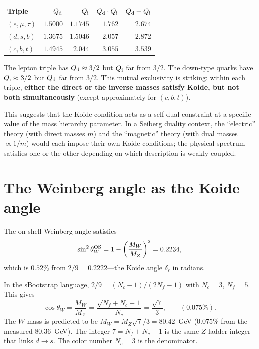 \documentclass[11pt]{article}
\begin{document}
\begin{center}\small
\begin{tabular}{@{}l r r r r@{}}
\toprule
Triple & $Q_{\rm d}$ & $Q_{\rm i}$ & $Q_{\rm d}\cdot Q_{\rm i}$ & $Q_{\rm d}+Q_{\rm i}$ \\
\midrule
$(e,\mu,\tau)$ & $1.5000$ & $1.1745$ & $1.762$ & $2.674$ \\
$(d,s,b)$ & $1.3675$ & $1.5046$ & $2.057$ & $2.872$ \\
$(c,b,t)$ & $1.4945$ & $2.044$ & $3.055$ & $3.539$ \\
\bottomrule
\end{tabular}
\end{center}

\noindent
The lepton triple has $Q_{\rm d}\approx 3/2$ but
$Q_{\rm i}$ far from $3/2$.  The down-type quarks have
$Q_{\rm i}\approx 3/2$ but $Q_{\rm d}$ far from $3/2$.
This mutual exclusivity is striking: within each triple,
\textbf{either the direct or the inverse masses satisfy Koide,
but not both simultaneously} (except approximately for $(c,b,t)$).

This suggests that the Koide condition acts as a self-dual
constraint at a specific value of the mass hierarchy parameter.
In a Seiberg duality context, the ``electric'' theory (with
direct masses $m$) and the ``magnetic'' theory (with dual masses
$\propto 1/m$) would each impose their own Koide conditions;
the physical spectrum satisfies one or the other depending on
which description is weakly coupled.

\section{The Weinberg angle as the Koide angle}

The on-shell Weinberg angle satisfies
\begin{equation}
  \sin^2\theta_W^{\rm OS} = 1 - \left(\frac{M_W}{M_Z}\right)^2
  = 0.2234,
\end{equation}
which is $0.52\%$ from $2/9 = 0.2222$---the Koide angle
$\delta_\ell$ in radians.

In the sBootstrap language, $2/9 = (N_c-1)/(2N_f-1)$ with
$N_c=3$, $N_f=5$.  This gives
\begin{equation}
  \boxed{\cos\theta_W = \frac{M_W}{M_Z}
  = \frac{\sqrt{N_f+N_c-1}}{N_c}
  = \frac{\sqrt{7}}{3},
  \qquad (0.075\%).}
\end{equation}
The $W$ mass is predicted to be $M_W = M_Z\sqrt{7}/3
= 80.42$~GeV ($0.075\%$ from the measured $80.36$~GeV).
The integer $7 = N_f+N_c-1$ is the same $Z$-ladder integer
that links $d\to s$.  The color number $N_c = 3$ is the
denominator.
\end{document}
